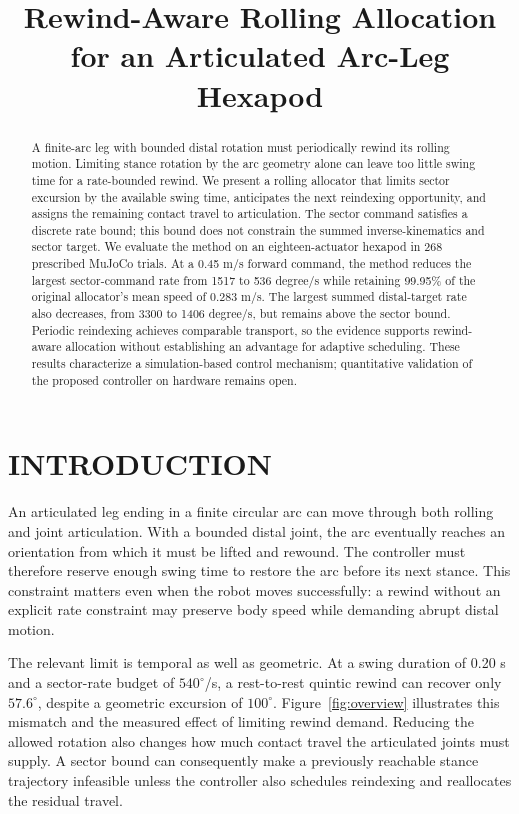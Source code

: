 \documentclass[letterpaper,10pt,conference]{ieeeconf}
\title{\LARGE\bf Rewind-Aware Rolling Allocation\\for an Articulated Arc-Leg Hexapod}
\author{\mbox{}}
\begin{document}
\maketitle\thispagestyle{empty}\pagestyle{empty}
\begin{abstract}
A finite-arc leg with bounded distal rotation must periodically rewind its rolling motion. Limiting stance rotation by the arc geometry alone can leave too little swing time for a rate-bounded rewind. We present a rolling allocator that limits sector excursion by the available swing time, anticipates the next reindexing opportunity, and assigns the remaining contact travel to articulation. The sector command satisfies a discrete rate bound; this bound does not constrain the summed inverse-kinematics and sector target. We evaluate the method on an eighteen-actuator hexapod in 268 prescribed MuJoCo trials. At a 0.45 m/s forward command, the method reduces the largest sector-command rate from 1517 to 536 degree/s while retaining 99.95\% of the original allocator's mean speed of 0.283 m/s. The largest summed distal-target rate also decreases, from 3300 to 1406 degree/s, but remains above the sector bound. Periodic reindexing achieves comparable transport, so the evidence supports rewind-aware allocation without establishing an advantage for adaptive scheduling. These results characterize a simulation-based control mechanism; quantitative validation of the proposed controller on hardware remains open.
\end{abstract}

\section{INTRODUCTION}
An articulated leg ending in a finite circular arc can move through both rolling and joint articulation. With a bounded distal joint, the arc eventually reaches an orientation from which it must be lifted and rewound. The controller must therefore reserve enough swing time to restore the arc before its next stance. This constraint matters even when the robot moves successfully: a rewind without an explicit rate constraint may preserve body speed while demanding abrupt distal motion.

The relevant limit is temporal as well as geometric. At a swing duration of 0.20 s and a sector-rate budget of $540^\circ$/s, a rest-to-rest quintic rewind can recover only $57.6^\circ$, despite a geometric excursion of $100^\circ$. Figure~\ref{fig:overview} illustrates this mismatch and the measured effect of limiting rewind demand. Reducing the allowed rotation also changes how much contact travel the articulated joints must supply. A sector bound can consequently make a previously reachable stance trajectory infeasible unless the controller also schedules reindexing and reallocates the residual travel.
\end{document}
